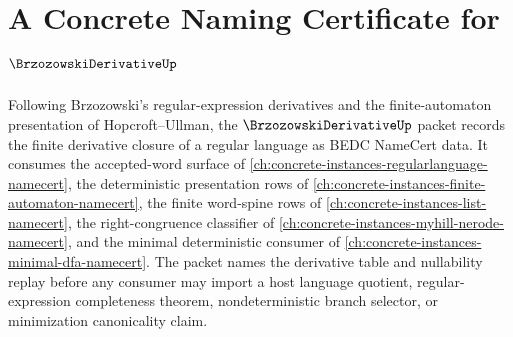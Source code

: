 \chapter{A Concrete Naming Certificate for $\BrzozowskiDerivativeUp$}
\label{ch:concrete-instances-brzozowski-derivative-namecert}

Following Brzozowski's regular-expression derivatives and the finite-automaton presentation of Hopcroft--Ullman, the $\BrzozowskiDerivativeUp$ packet records the finite derivative closure of a regular language as BEDC NameCert data. It consumes the accepted-word surface of \autoref{ch:concrete-instances-regularlanguage-namecert}, the deterministic presentation rows of \autoref{ch:concrete-instances-finite-automaton-namecert}, the finite word-spine rows of \autoref{ch:concrete-instances-list-namecert}, the right-congruence classifier of \autoref{ch:concrete-instances-myhill-nerode-namecert}, and the minimal deterministic consumer of \autoref{ch:concrete-instances-minimal-dfa-namecert}. The packet names the derivative table and nullability replay before any consumer may import a host language quotient, regular-expression completeness theorem, nondeterministic branch selector, or minimization canonicality claim.

